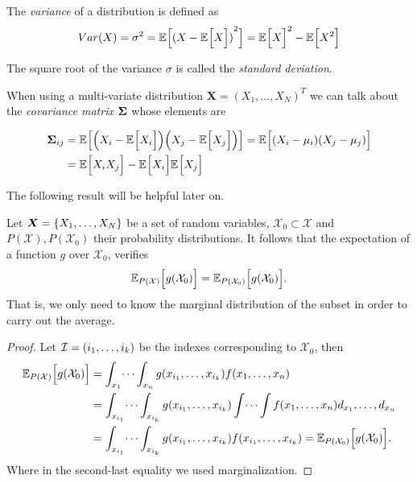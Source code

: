 \begin{definition}
  The \emph{variance} of a distribution is defined as
  \[
    Var(X) = \sigma^2 = \mathbb{E}_{}\Big[{(X - \mathbb{E}_{}\Big[X\Big])}^2\Big] = \mathbb{E}_{}\Big[X\Big]^2 - \mathbb{E}_{}\Big[X^2\Big]
  \]

  The square root of the variance \(\sigma\) is called the \emph{standard deviation}.
\end{definition}

When using a multi-variate distribution \(\bm{X} = {(X_1,\dots,X_N)}^T\) we can talk about the \emph{covariance
  matrix} \(\bm{\Sigma} \) whose elements are

\[
\begin{aligned}
\bm{\Sigma}_{ij} &= \mathbb{E}_{}\Big[\Big(X_i - \mathbb{E}_{}\Big[X_i\Big]\Big)
  \Big(X_j - \mathbb{E}_{}\Big[X_j\Big]\Big)\Big] = \mathbb{E}_{}\Big[(X_i - \mu_i)(X_j - \mu_j)\Big]\\
&=\mathbb{E}_{}\Big[X_i X_j\Big]-\mathbb{E}_{}\Big[X_i\Big]\mathbb{E}_{}\Big[X_j\Big]
\end{aligned}
\]

The following result will be helpful later on.

\begin{proposition}\label{prop:expectation_over_marginal}
  Let \(\bm{X} = \{X_1,\dots,X_N\}\) be a set of random variables,
  \(\mathcal{X}_{0} \subset \mathcal{X}\) and \(P(\mathcal{X}), P(\mathcal{X}_{0})\)
  their probability distributions.
  It follows that the expectation of a function \(g\) over \(\mathcal{X}_0\), verifies
    \[
      \mathbb{E}_{P(\mathcal{X})}\Big[g(\mathcal{X}_0)\Big] = \mathbb{E}_{P(\mathcal{X}_0)}\Big[g(\mathcal{X}_0)\Big].
    \]
    That is, we only need to know the marginal distribution of the subset in
    order to carry out the average.
\end{proposition}

\begin{proof}
  Let \(\mathcal{I} = (i_{1}, \dots, i_{k})\) be the indexes corresponding to \(\mathcal{X}_{0}\), then
  \[
    \begin{aligned}
      \mathbb{E}_{P(\mathcal{X})}\Big[g(\mathcal{X}_{0})\Big]&= \int_{x_{1}}\dots\int_{x_{n}}g(x_{i_{1}},\dots,x_{i_{k}})f(x_{1},\dots,x_{n}) \\
      &= \int_{x_{i_{1}}}\dots\int_{x_{i_{k}}} g(x_{i_{1}},\dots,x_{i_{k}}) \int \dots \int f(x_{1},\dots,x_{n}) d_{x_{1}},\dots,d_{x_{n}}\\
      &= \int_{x_{i_{1}}}\dots\int_{x_{i_{k}}} g(x_{i_{1}},\dots,x_{i_{k}}) f(x_{i_{1}},\dots,x_{i_{k}}) =  \mathbb{E}_{P(\mathcal{X}_{0})}\Big[g(\mathcal{X}_{0})\Big].\\
      \end{aligned}
  \]
Where in the second-last equality we used marginalization.
\end{proof}

